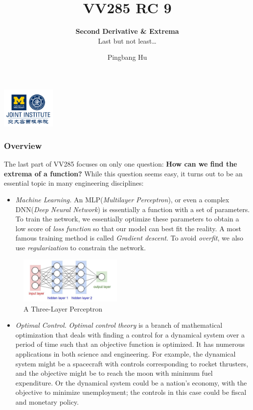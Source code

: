 \documentclass[10pt, t, allowdisplaybreaks]{beamer}
\title{VV285 RC 9}
\subtitle{\textbf{Second Derivative \& Extrema}\\\large Last but not least\dots}
\institute[UM-SJTU JI]{University of Michigan-Shanghai Jiao Tong University Joint Institute}
\author{Pingbang Hu}
\renewcommand{\emph}[1]{{\color{Turquoise3}\textsl{#1}}}
\begin{document}
\begin{frame}
    \titlepage
    \begin{center}
        \includegraphics[height=2cm]{Figures/logo/logo2.png}
    \end{center}
\end{frame}

\begin{frame}[allowframebreaks]
    \frametitle{Overview}
    The last part of VV285 focuses on only one question: \textbf{How can we find the extrema of a function?} While this question seems easy, it turns out to be an essential topic in many engineering disciplines:
    \begin{itemize}
        \item \emph{Machine Learning.} An MLP(\textit{Multilayer Perceptron}), or even a complex DNN(\textit{Deep Neural Network}) is essentially a function with a set of parameters. To train the network, we essentially optimize these parameters to obtain a low score of \textit{loss function} so that our model can best fit the reality. A most famous training method is called \textit{Gradient descent}. To avoid \textit{overfit}, we also use \textit{regularization} to constrain the network.
    \end{itemize}
    \begin{figure}[H]
        \centering
        \includegraphics[width=0.45\textwidth]{Figures/2020-07-28-20-42-04.png}
        \caption{A Three-Layer Perceptron}
    \end{figure}
    \newpage
    \begin{itemize}
        \item \emph{Optimal Control.} \textit{Optimal control theory} is a branch of mathematical optimization that deals with finding a control for a dynamical system over a period of time such that an objective function is optimized. It has numerous applications in both science and engineering. For example, the dynamical system might be a spacecraft with controls corresponding to rocket thrusters, and the objective might be to reach the moon with minimum fuel expenditure. Or the dynamical system could be a nation's economy, with the objective to minimize unemployment; the controls in this case could be fiscal and monetary policy.

\end{itemize}
\end{frame}
\end{document}
